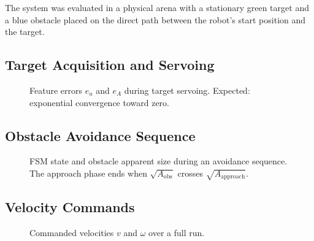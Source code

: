 \documentclass[journal, 10pt]{IEEEtran}
\begin{document}
The system was evaluated in a physical arena with a stationary green target
and a blue obstacle placed on the direct path between the robot's start
position and the target.

\subsection{Target Acquisition and Servoing}

\begin{figure}[H]
  \centering
  \caption{Feature errors $e_u$ and $e_A$ during target servoing.
  Expected: exponential convergence toward zero.}
  \label{fig:errors}
\end{figure}

\subsection{Obstacle Avoidance Sequence}

\begin{figure}[H]
  \centering
  \caption{FSM state and obstacle apparent size during an avoidance
  sequence. The approach phase ends when $\sqrt{A_{\text{obs}}}$ crosses
  $\sqrt{A_{\text{approach}}}$.}
  \label{fig:avoidance}
\end{figure}

\subsection{Velocity Commands}

\begin{figure}[H]
  \centering
  \caption{Commanded velocities $v$ and $\omega$ over a full run.}
  \label{fig:cmds}
\end{figure}
\end{document}
